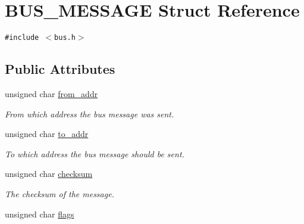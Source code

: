\hypertarget{structBUS__MESSAGE}{
\section{BUS\_\-MESSAGE Struct Reference}
\label{structBUS__MESSAGE}
}
{\tt \#include $<$bus.h$>$}

\subsection*{Public Attributes}
\begin{CompactItemize}
\item 
\hypertarget{structBUS__MESSAGE_1e1630d22cf441581a38402ba05cb06d}{
unsigned char \hyperlink{structBUS__MESSAGE_1e1630d22cf441581a38402ba05cb06d}{from\_\-addr}}
\label{structBUS__MESSAGE_1e1630d22cf441581a38402ba05cb06d}

\begin{CompactList}\small\item\em From which address the bus message was sent. \item\end{CompactList}\item 
\hypertarget{structBUS__MESSAGE_a0f1fc7a86014731faad6bd79f98096b}{
unsigned char \hyperlink{structBUS__MESSAGE_a0f1fc7a86014731faad6bd79f98096b}{to\_\-addr}}
\label{structBUS__MESSAGE_a0f1fc7a86014731faad6bd79f98096b}

\begin{CompactList}\small\item\em To which address the bus message should be sent. \item\end{CompactList}\item 
\hypertarget{structBUS__MESSAGE_961904de115f81f82f9d5d0967760d59}{
unsigned char \hyperlink{structBUS__MESSAGE_961904de115f81f82f9d5d0967760d59}{checksum}}
\label{structBUS__MESSAGE_961904de115f81f82f9d5d0967760d59}

\begin{CompactList}\small\item\em The checksum of the message. \item\end{CompactList}\item 
\hypertarget{structBUS__MESSAGE_3595149bb5cf10fbc1fe6ba82a1fbf93}{
unsigned char \hyperlink{structBUS__MESSAGE_3595149bb5cf10fbc1fe6ba82a1fbf93}{flags}}
\label{structBUS__MESSAGE_3595149bb5cf10fbc1fe6ba82a1fbf93}


\end{CompactItemize}
